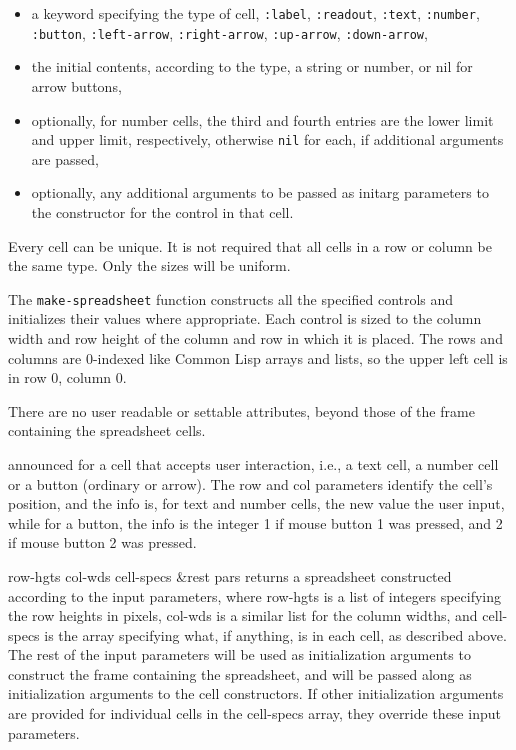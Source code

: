 \documentclass[twoside,openright,11pt]{report}
\newcommand{\tp}[1]{\texttt{#1}}
\begin{document}
\begin{itemize}

\item a keyword specifying the type of cell, \tp{:label},
\tp{:readout}, \tp{:text}, \tp{:number}, \tp{:button},
\tp{:left-arrow}, \tp{:right-arrow}, \tp{:up-arrow}, \tp{:down-arrow},

\item the initial contents, according to the type, a string or number,
or nil for arrow buttons,

\item optionally, for number cells, the third and fourth entries are
the lower limit and upper limit, respectively, otherwise \tp{nil}
for each, if additional arguments are passed,

\item optionally, any additional arguments to be passed as initarg
parameters to the constructor for the control in that cell.

\end{itemize}

Every cell can be unique.  It is not required that all cells in a row
or column be the same type.  Only the sizes will be uniform.

The \tp{make-spreadsheet} function constructs all the specified
controls and initializes their values where appropriate.  Each control
is sized to the column width and row height of the column and row in
which it is placed.  The rows and columns are 0-indexed like Common
Lisp arrays and lists, so the upper left cell is in row 0, column 0.


There are no user readable or settable attributes, beyond those of the
frame containing the spreadsheet cells.


{announced for a cell that accepts user interaction, i.e., a text
cell, a number cell or a button (ordinary or arrow).  The row and col
parameters identify the cell's position, and the info is, for text and
number cells, the new value the user input, while for a button, the
info is the integer 1 if mouse button 1 was pressed, and 2 if mouse
button 2 was pressed.}


{row-hgts col-wds cell-specs \&rest pars}
{returns a spreadsheet constructed according to the input parameters,
where row-hgts is a list of integers specifying the row heights in
pixels, col-wds is a similar list for the column widths, and
cell-specs is the array specifying what, if anything, is in each
cell, as described above.  The rest of the input parameters will be
used as initialization arguments to construct the frame containing the
spreadsheet, and will be passed along as initialization arguments to
the cell constructors.  If other initialization arguments are provided
for individual cells in the cell-specs array, they override these
input parameters.}
\end{document}

